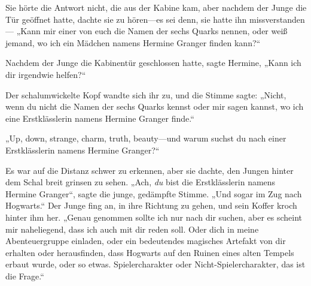 Sie hörte die Antwort nicht, die aus der Kabine kam, aber nachdem der Junge die Tür geöffnet hatte, dachte sie zu hören—es sei denn, sie hatte ihn missverstanden— „Kann mir einer von euch die Namen der sechs Quarks nennen, oder weiß jemand, wo ich ein Mädchen namens Hermine Granger finden kann?“%

Nachdem der Junge die Kabinentür geschlossen hatte, sagte Hermine, „Kann ich dir irgendwie helfen?“

Der schalumwickelte Kopf wandte sich ihr zu, und die Stimme sagte: „Nicht, wenn du nicht die Namen der sechs Quarks kennst oder mir sagen kannst, wo ich eine Erstklässlerin namens Hermine Granger finde.“

„Up, down, strange, charm, truth, beauty—und warum suchst du nach einer Erstklässlerin namens Hermine Granger?“

Es war auf die Distanz schwer zu erkennen, aber sie dachte, den Jungen hinter dem Schal breit grinsen zu sehen. „Ach, \emph{du} bist die Erstklässlerin namens Hermine Granger“, sagte die junge, gedämpfte Stimme. „Und sogar im Zug nach Hogwarts.“ Der Junge fing an, in ihre Richtung zu gehen, und sein Koffer kroch hinter ihm her. „Genau genommen sollte ich nur nach dir suchen, aber es scheint mir naheliegend, dass ich auch mit dir reden soll. Oder dich in meine Abenteuergruppe einladen, oder ein bedeutendes magisches Artefakt von dir erhalten oder herausfinden, dass Hogwarts auf den Ruinen eines alten Tempels erbaut wurde, oder so etwas. Spielercharakter oder Nicht-Spielercharakter, das ist die Frage.“

